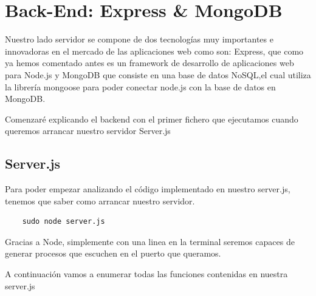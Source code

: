 \section{Back-End: Express & MongoDB}
Nuestro lado servidor se compone de dos tecnologías muy importantes e innovadoras en el mercado de las aplicaciones web como son: Express, que como ya hemos comentado antes es un framework de desarrollo de aplicaciones web para Node.js y MongoDB que consiste en una base de datos NoSQL,el cual utiliza la librería mongoose para poder conectar node.js con la base de datos en MongoDB.

Comenzaré explicando el backend con el primer fichero que ejecutamos cuando queremos arrancar nuestro servidor Server.js

\subsection{Server.js} Para poder empezar analizando el código implementado en nuestro server.js, tenemos que saber como arrancar nuestro servidor.

\begin{lstlisting}
    sudo node server.js
\end{lstlisting}
    
Gracias a Node, simplemente con una linea en la terminal seremos capaces de generar procesos que escuchen en el puerto que queramos.

A continuación vamos a enumerar todas las funciones contenidas en nuestra server.js

